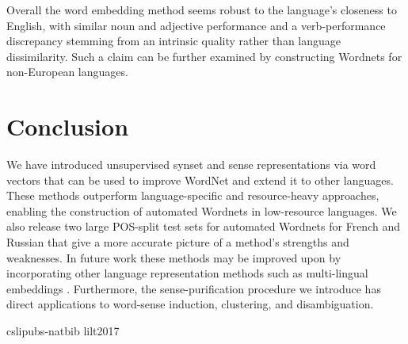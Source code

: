 \documentclass{book}
\begin{document}
Overall the word embedding method seems robust to the language's closeness to English, with similar noun and adjective performance and a verb-performance discrepancy stemming from an intrinsic quality rather than language dissimilarity.
Such a claim can be further examined by constructing Wordnets for non-European languages.

\section{Conclusion}

We have introduced unsupervised synset and sense representations via word vectors that can be used to improve WordNet and extend it to other languages.
These methods outperform language-specific and resource-heavy approaches, enabling the construction of automated Wordnets in low-resource languages.
We also release two large POS-split test sets for automated Wordnets for French and Russian that give a more accurate picture of a method's strengths and weaknesses.
In future work these methods may be improved upon by incorporating other language representation methods such as multi-lingual embeddings \citep{Faruqui:14}.
Furthermore, the sense-purification procedure we introduce has direct applications to word-sense induction, clustering, and disambiguation.

 {cslipubs-natbib}
 {lilt2017}
\end{document}
